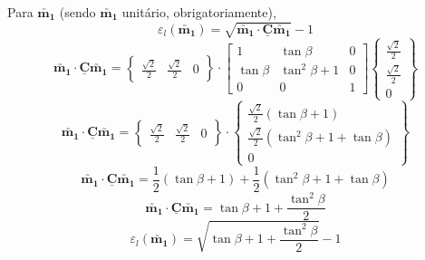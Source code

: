 \begin{enumerate}
		Para $\utilde{\mathbf{m_1}}$ (sendo $\utilde{\mathbf{m_1}}$ unitário, obrigatoriamente),
		\[\varepsilon_l(\utilde{\mathbf{m_1}})=\sqrt{\utilde{\mathbf{m_1}}\cdot\underline{\mathbf{C}}\utilde{\mathbf{m_1}}}-1\]
		\[
			\utilde{\mathbf{m_1}}\cdot\underline{\mathbf{C}}\utilde{\mathbf{m_1}}
			=
			\begin{Bmatrix}
				\frac{\sqrt{2}}{2} & \frac{\sqrt{2}}{2} & 0
			\end{Bmatrix}
			\cdot
			\begin{bmatrix}
				1 & \tan\beta & 0 \\
				\tan\beta & \tan^2\beta + 1 & 0 \\
				0 & 0 & 1
			\end{bmatrix}
			\begin{Bmatrix}
				\frac{\sqrt{2}}{2} \\ \frac{\sqrt{2}}{2} \\ 0
			\end{Bmatrix}
		\]
		\[
			\utilde{\mathbf{m_1}}\cdot\underline{\mathbf{C}}\utilde{\mathbf{m_1}}
			=
			\begin{Bmatrix}
				\frac{\sqrt{2}}{2} & \frac{\sqrt{2}}{2} & 0
			\end{Bmatrix}
			\cdot
			\begin{Bmatrix}
				\frac{\sqrt{2}}{2}(\tan\beta+1) \\ \frac{\sqrt{2}}{2}(\tan^2\beta+1+\tan\beta) \\ 0
			\end{Bmatrix}
		\]
		\[\utilde{\mathbf{m_1}}\cdot\underline{\mathbf{C}}\utilde{\mathbf{m_1}}=\frac{1}{2}(\tan\beta+1)+\frac{1}{2}(\tan^2\beta+1+\tan\beta)\]
		\[\utilde{\mathbf{m_1}}\cdot\underline{\mathbf{C}}\utilde{\mathbf{m_1}}=\tan\beta+1+\frac{\tan^2\beta}{2}\]
		\[\varepsilon_l(\utilde{\mathbf{m_1}})=\sqrt{\tan\beta+1+\frac{\tan^2\beta}{2}}-1\]
	

\end{enumerate}
